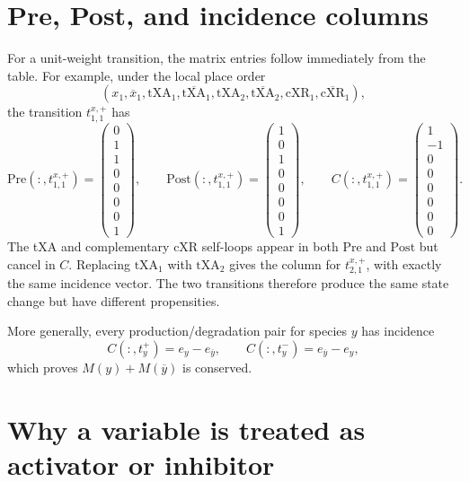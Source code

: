 \documentclass[11pt,a4paper]{article}
\newcommand{\txa}{\mathrm{tXA}}
\newcommand{\cxr}{\mathrm{cXR}}
\newcommand{\Pre}{\mathrm{Pre}}
\newcommand{\Post}{\mathrm{Post}}
\begin{document}
\section{Pre, Post, and incidence columns}

For a unit-weight transition, the matrix entries follow immediately from the
table.  For example, under the local place order
\[
 (x_1,\overline{x}_1,\txa_1,\overline{\txa}_1,
  \txa_2,\overline{\txa}_2,\cxr_1,\overline{\cxr}_1),
\]
the transition $t^{x,+}_{1,1}$ has
\[
 \Pre(:,t^{x,+}_{1,1})=
 \begin{pmatrix}0\\1\\1\\0\\0\\0\\0\\1\end{pmatrix},
 \qquad
 \Post(:,t^{x,+}_{1,1})=
 \begin{pmatrix}1\\0\\1\\0\\0\\0\\0\\1\end{pmatrix},
 \qquad
 C(:,t^{x,+}_{1,1})=
 \begin{pmatrix}1\\-1\\0\\0\\0\\0\\0\\0\end{pmatrix}.
\]
The tXA and complementary cXR self-loops appear in both $\Pre$ and $\Post$
but cancel in $C$.  Replacing $\txa_1$ with $\txa_2$ gives the column for
$t^{x,+}_{2,1}$, with exactly the same incidence vector.  The two transitions
therefore produce the same state change but have different propensities.

More generally, every production/degradation pair for species $y$ has
incidence
\[
 C(:,t_y^+)=e_y-e_{\overline y},\qquad
 C(:,t_y^-)=e_{\overline y}-e_y,
\]
which proves $M(y)+M(\overline y)$ is conserved.

\section{Why a variable is treated as activator or inhibitor}
\end{document}
